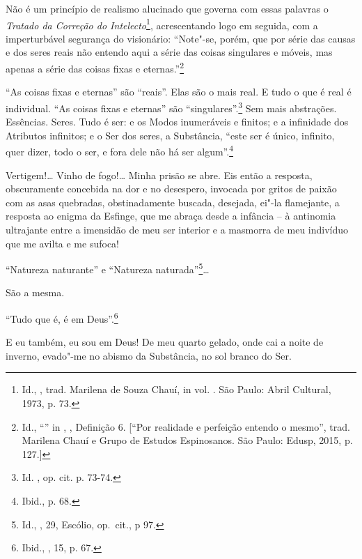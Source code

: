 Não é um princípio de realismo alucinado que governa com essas palavras
o \emph{Tratado da Correção do Intelecto}\footnote{Id., {}, trad. Marilena de Souza Chauí, in {} vol. \scalebox{0.8}{XVII}. São Paulo: Abril Cultural, 1973, p. 73.},
acrescentando logo em seguida, com a imperturbável segurança do
visionário: ``Note"-se, porém, que por série das causas e dos seres reais
não entendo aqui a série das coisas singulares e móveis, mas apenas a
série das coisas fixas e eternas.''\footnote{Id., ``{}'' in {}, \scalebox{0.8}{II}, Definição 6.
  {[}``Por realidade e perfeição entendo o mesmo'', trad. Marilena Chauí
  e Grupo de Estudos Espinosanos. São Paulo: Edusp, 2015, p. 127.{]}}

``As coisas fixas e eternas'' são ``reais''. Elas são o mais real. E
tudo o que é real é individual. ``As coisas fixas e eternas'' são
``singulares''.\footnote{Id. {},
  op. cit. p. 73-74.} Sem mais abstrações. Essências. Seres. Tudo é ser:
e os Modos inumeráveis e finitos; e a infinidade dos Atributos
infinitos; e o Ser dos seres, a Substância, ``este ser é único,
infinito, quer dizer, todo o ser, e fora dele não há ser
algum''.\footnote{Ibid., p. 68.}

Vertigem!\ldots{} Vinho de fogo!\ldots{} Minha prisão se abre. Eis então a
resposta, obscuramente concebida na dor e no desespero, invocada por
gritos de paixão com as asas quebradas, obstinadamente buscada,
desejada, ei"-la flamejante, a resposta ao enigma da Esfinge, que me
abraça desde a infância -- à antinomia ultrajante entre a imensidão de
meu ser interior e a masmorra de meu indivíduo que me avilta e me
sufoca!

``Natureza naturante'' e ``Natureza naturada''\footnote{Id.,
  {} \scalebox{0.8}{I}, 29, Escólio, op.~cit., p 97.}\ldots{}

São a mesma.

``Tudo que é, é em Deus''.\footnote{Ibid., \scalebox{0.8}{I}, 15, p. 67.}

E eu também, eu sou em Deus! De meu quarto gelado, onde cai a noite de
inverno, evado"-me no abismo da Substância, no sol branco do Ser.


